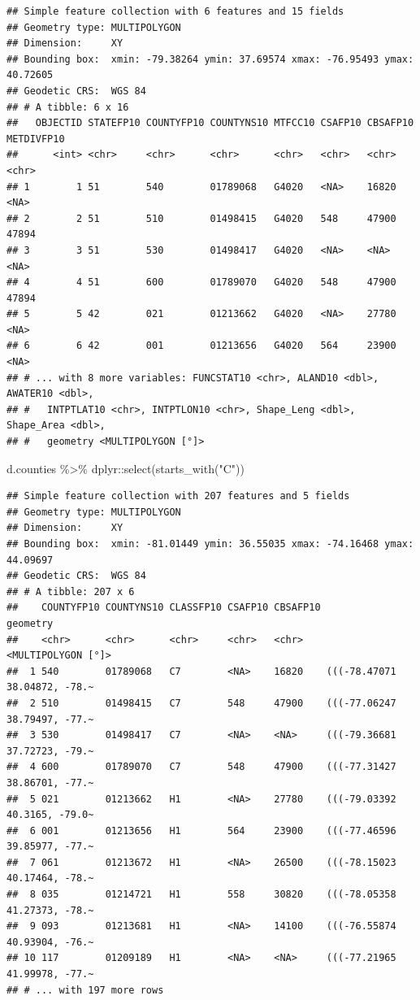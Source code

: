 \documentclass[]{article}
\newenvironment{Shaded}{\begin{snugshade}}{\end{snugshade}}
\newcommand{\FunctionTok}[1]{\textcolor[rgb]{0.00,0.00,0.00}{#1}}
\newcommand{\NormalTok}[1]{#1}
\newcommand{\SpecialCharTok}[1]{\textcolor[rgb]{0.00,0.00,0.00}{#1}}
\newcommand{\StringTok}[1]{\textcolor[rgb]{0.31,0.60,0.02}{#1}}
\begin{document}
\begin{verbatim}
## Simple feature collection with 6 features and 15 fields
## Geometry type: MULTIPOLYGON
## Dimension:     XY
## Bounding box:  xmin: -79.38264 ymin: 37.69574 xmax: -76.95493 ymax: 40.72605
## Geodetic CRS:  WGS 84
## # A tibble: 6 x 16
##   OBJECTID STATEFP10 COUNTYFP10 COUNTYNS10 MTFCC10 CSAFP10 CBSAFP10 METDIVFP10
##      <int> <chr>     <chr>      <chr>      <chr>   <chr>   <chr>    <chr>     
## 1        1 51        540        01789068   G4020   <NA>    16820    <NA>      
## 2        2 51        510        01498415   G4020   548     47900    47894     
## 3        3 51        530        01498417   G4020   <NA>    <NA>     <NA>      
## 4        4 51        600        01789070   G4020   548     47900    47894     
## 5        5 42        021        01213662   G4020   <NA>    27780    <NA>      
## 6        6 42        001        01213656   G4020   564     23900    <NA>      
## # ... with 8 more variables: FUNCSTAT10 <chr>, ALAND10 <dbl>, AWATER10 <dbl>,
## #   INTPTLAT10 <chr>, INTPTLON10 <chr>, Shape_Leng <dbl>, Shape_Area <dbl>,
## #   geometry <MULTIPOLYGON [°]>
\end{verbatim}

\begin{Shaded}
\begin{Highlighting}[]
\NormalTok{d.counties }\SpecialCharTok{\%\textgreater{}\%}\NormalTok{ dplyr}\SpecialCharTok{::}\FunctionTok{select}\NormalTok{(}\FunctionTok{starts\_with}\NormalTok{(}\StringTok{"C"}\NormalTok{))}
\end{Highlighting}
\end{Shaded}

\begin{verbatim}
## Simple feature collection with 207 features and 5 fields
## Geometry type: MULTIPOLYGON
## Dimension:     XY
## Bounding box:  xmin: -81.01449 ymin: 36.55035 xmax: -74.16468 ymax: 44.09697
## Geodetic CRS:  WGS 84
## # A tibble: 207 x 6
##    COUNTYFP10 COUNTYNS10 CLASSFP10 CSAFP10 CBSAFP10                     geometry
##    <chr>      <chr>      <chr>     <chr>   <chr>              <MULTIPOLYGON [°]>
##  1 540        01789068   C7        <NA>    16820    (((-78.47071 38.04872, -78.~
##  2 510        01498415   C7        548     47900    (((-77.06247 38.79497, -77.~
##  3 530        01498417   C7        <NA>    <NA>     (((-79.36681 37.72723, -79.~
##  4 600        01789070   C7        548     47900    (((-77.31427 38.86701, -77.~
##  5 021        01213662   H1        <NA>    27780    (((-79.03392 40.3165, -79.0~
##  6 001        01213656   H1        564     23900    (((-77.46596 39.85977, -77.~
##  7 061        01213672   H1        <NA>    26500    (((-78.15023 40.17464, -78.~
##  8 035        01214721   H1        558     30820    (((-78.05358 41.27373, -78.~
##  9 093        01213681   H1        <NA>    14100    (((-76.55874 40.93904, -76.~
## 10 117        01209189   H1        <NA>    <NA>     (((-77.21965 41.99978, -77.~
## # ... with 197 more rows
\end{verbatim}
\end{document}
